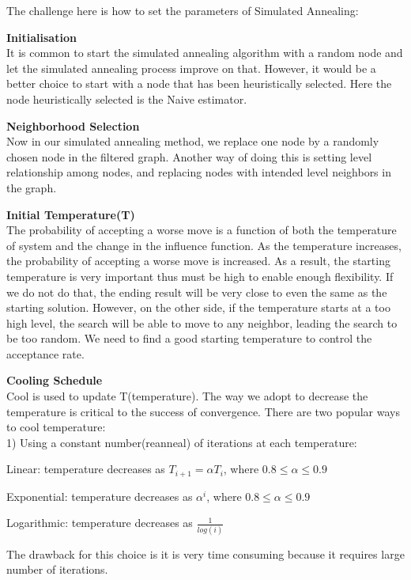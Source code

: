 \documentclass{article}
\begin{document}
The challenge here is how to set the parameters of Simulated Annealing:
\begin{enumerate}
\begin{item}%
\textbf{Initialisation}\\
It is common to start the simulated annealing algorithm with a random node and let the simulated annealing process improve on that. However, it would be a better choice to start with a node that has been heuristically selected. Here the node heuristically selected is the Naive estimator.
\end{item}
\begin{item}%
\textbf{Neighborhood Selection}\\
Now in our simulated annealing method, we replace one node by a randomly chosen node in the filtered graph. Another way of doing this is setting level relationship among nodes, and replacing nodes with intended level neighbors in the graph. 
\end{item}
\begin{item}%
\textbf{Initial Temperature(T)}\\
The probability of accepting a worse move is a function of both the temperature of system and the change in the influence function. As the temperature increases, the probability of accepting a worse move is increased. As a result, the starting temperature is very important thus must be high to enable enough flexibility. If we do not do that, the ending result will be very close to even the same as the starting solution. However, on the other side, if the temperature starts at a too high level, the search will be able to move to any neighbor, leading the search to be too random. We need to find a good starting temperature to control the acceptance rate. 
\end{item}

\begin{item}%
\textbf{Cooling Schedule}\\
Cool is used to update T(temperature). The way we adopt to decrease the temperature is critical to the success of convergence. There are two popular ways to cool temperature: \\

1) Using a constant number(reanneal) of iterations at each temperature: 
\begin{list}{*}{}
\item Linear: temperature decreases as $T_{i+1} = \alpha T_{i}$, where $0.8 \leq \alpha \leq 0.9$
\item Exponential: temperature decreases as $\alpha^{i}$, where $0.8 \leq \alpha \leq 0.9$
\item Logarithmic: temperature decreases as $\frac{1}{log(i)}$
\end{list}
The drawback for this choice is it is very time consuming because it requires large number of iterations.  \\


\end{item}
\end{enumerate}
\end{document}
